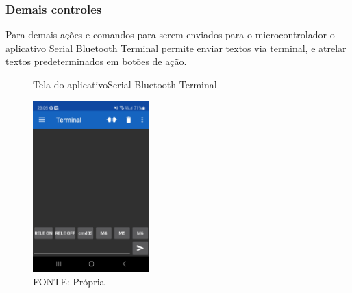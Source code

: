 \subsubsection{Demais controles}

Para demais ações e comandos para serem enviados para o microcontrolador
o aplicativo Serial Bluetooth Terminal permite enviar textos via terminal,
e atrelar textos predeterminados em botões de ação.

\begin{figure}[htb]
	\centering
	\caption{Tela do aplicativoSerial Bluetooth Terminal}
	\includegraphics[width=0.40\textwidth]{figures/serialbluetoothterminal}
    \caption*{FONTE: Própria}
	\label{serialbluetoothterminal_tela}
\end{figure}
